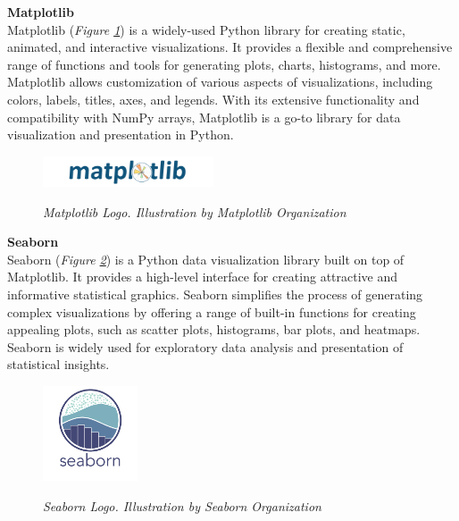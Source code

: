 \vspace{0.5cm}
\textbf{Matplotlib} \\

Matplotlib (\textit{Figure \ref{fig:matplotlib-logo}}) is a widely-used Python library for creating static, animated, and interactive visualizations. It provides a flexible and comprehensive range of functions and tools for generating plots, charts, histograms, and more. Matplotlib allows customization of various aspects of visualizations, including colors, labels, titles, axes, and legends. With its extensive functionality and compatibility with NumPy arrays, Matplotlib is a go-to library for data visualization and presentation in Python.

\begin{figure}[H]
\centering
\includegraphics[width=0.45\textwidth]{imatges/studies_and_decisions/matplotlib-logo.png}
\caption[Matplotlib Logo]{\textit{Matplotlib Logo. Illustration by Matplotlib Organization}}
{\label{fig:matplotlib-logo}}
\end{figure}

\vspace{0.5cm}
\textbf{Seaborn} \\

Seaborn (\textit{Figure \ref{fig:seaborn-logo}}) is a Python data visualization library built on top of Matplotlib. It provides a high-level interface for creating attractive and informative statistical graphics. Seaborn simplifies the process of generating complex visualizations by offering a range of built-in functions for creating appealing plots, such as scatter plots, histograms, bar plots, and heatmaps. Seaborn is widely used for exploratory data analysis and presentation of statistical insights.

\begin{figure}[H]
\centering
\includegraphics[width=0.25\textwidth]{imatges/studies_and_decisions/seaborn-logo.png}
\caption[Seaborn Logo]{\textit{Seaborn Logo. Illustration by Seaborn Organization}}
{\label{fig:seaborn-logo}}
\end{figure}


